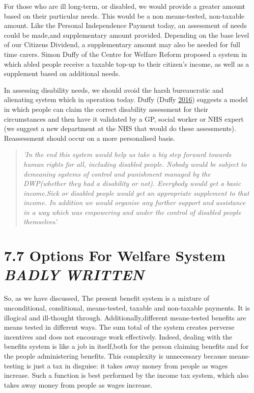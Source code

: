 \documentclass[]{tufte-handout}
\begin{document}
For those who are ill long-term, or disabled, we would provide a greater
amount based on their particular needs. This would be a non
means-tested, non-taxable amount. Like the Personal Independence Payment
today, an assessment of needs could be made,and supplementary amount
provided. Depending on the base level of our Citizens Dividend, a
supplementary amount may also be needed for full time carers. Simon
Duffy of the Centre for Welfare Reform proposed a system in which abled
people receive a taxable top-up to their citizen's income, as well as a
supplement based on additional needs.

In assessing disability needs, we should avoid the harsh bureaucratic
and alienating system which in operation today. Duffy (Duffy
\protect\hyperlink{ref-Duffy}{2016}) suggests a model in which people
can claim the correct disability assessment for their circumstances and
then have it validated by a GP, social worker or NHS expert (we suggest
a new department at the NHS that would do these assessments).
Reassessment should occur on a more personalised basis.

\begin{quote}
\emph{'In the end this system would help us take a big step forward
towards human rights for all, including disabled people. Nobody would be
subject to demeaning systems of control and punishment managed by the
DWP(whether they had a disability or not). Everybody would get a basic
income.Sick or disabled people would get an appropriate supplement to
that income. In addition we would organise any further support and
assistance in a way which was empowering and under the control of
disabled people themselves}.'
\end{quote}

\hypertarget{options-for-welfare-system-badly-written}{%
\section{\texorpdfstring{7.7 Options For Welfare System
\textbf{\emph{BADLY
WRITTEN}}}{7.7 Options For Welfare System BADLY WRITTEN}}\label{options-for-welfare-system-badly-written}}

So, as we have discussed, The present benefit system is a mixture of
unconditional, conditional, means-tested, taxable and non-taxable
payments. It is illogical and ill-thought through.
Additionally,different means-tested benefits are means tested in
different ways. The sum total of the system creates perverse incentives
and does not encourage work effectively. Indeed, dealing with the
benefits system is like a job in itself,both for the person claiming
benefits and for the people administering benefits. This complexity is
unnecessary because means-testing is just a tax in disguise: it takes
away money from people as wages increase. Such a function is best
performed by the income tax system, which also takes away money from
people as wages increase.
\end{document}
